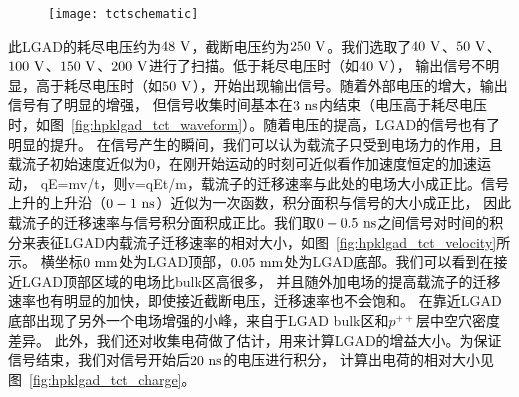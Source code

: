 \begin{figure}[!htbp]
    \centering
    \texttt{[image: tctschematic]}
    \label{fig:tctschematic}
\end{figure}

此LGAD的耗尽电压约为$48\rm \ V$，截断电压约为$250\rm \ V$。我们选取了$40\rm \ V$、$50\rm \ V$、$100\rm \ V$、$150\rm \ V$、$200\rm \ V$进行了扫描。低于耗尽电压时（如$40\rm \ V$），
输出信号不明显，高于耗尽电压时（如$50\rm \ V$），开始出现输出信号。随着外部电压的增大，输出信号有了明显的增强，
但信号收集时间基本在$3\rm \ ns$内结束（电压高于耗尽电压时，如图~\ref{fig:hpklgad_tct_waveform}）。随着电压的提高，LGAD的信号也有了明显的提升。
在信号产生的瞬间，我们可以认为载流子只受到电场力的作用，且载流子初始速度近似为$0$，在刚开始运动的时刻可近似看作加速度恒定的加速运动，
qE=mv/t，则v=qEt/m，载流子的迁移速率与此处的电场大小成正比。信号上升的上升沿（$0-1\rm \ ns$）近似为一次函数，积分面积与信号的大小成正比，
因此载流子的迁移速率与信号积分面积成正比。我们取$0-0.5\rm \ ns$之间信号对时间的积分来表征LGAD内载流子迁移速率的相对大小，如图~\ref{fig:hpklgad_tct_velocity}所示。
横坐标$0\rm \ mm$处为LGAD顶部，$0.05\rm \ mm$处为LGAD底部。我们可以看到在接近LGAD顶部区域的电场比bulk区高很多，
并且随外加电场的提高载流子的迁移速率也有明显的加快，即使接近截断电压，迁移速率也不会饱和。
在靠近LGAD底部出现了另外一个电场增强的小峰，来自于LGAD bulk区和$p^{++}$层中空穴密度差异。
此外，我们还对收集电荷做了估计，用来计算LGAD的增益大小。为保证信号结束，我们对信号开始后$20\rm \ ns$的电压进行积分，
计算出电荷的相对大小见图~\ref{fig:hpklgad_tct_charge}。

